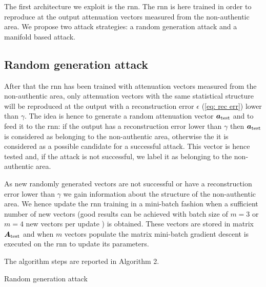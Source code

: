 \documentclass[draftcls,onecolumn,12pt]{IEEEtran}
\begin{document}
The first architecture we exploit is the \ac{rnn}. The \ac{rnn} is here trained in order to reproduce at the output attenuation vectors measured from the non-authentic area. We propose two attack strategies: a random generation attack and a manifold based attack.

\subsection{Random generation attack}
After that the \ac{rnn} has been trained with attenuation vectors measured from the non-authentic area, only attenuation vectors with the same statistical structure will be reproduced at the output with a reconstruction error $\epsilon$ (\ref{eq: rec err}) lower than $\gamma$. The idea is hence to generate a random attenuation vector $\bm{a}_{\rm test}$ and to feed it to the \ac{rnn}: if the output has a reconstruction error lower than $\gamma$ then $\bm{a}_{\rm test}$ is considered as belonging to the non-authentic area, otherwise the it is considered as a possible candidate for a successful attack. This vector is hence tested and, if the attack is not successful, we label it as belonging to the non-authentic area.

As new randomly generated vectors are not successful or have a reconstruction error lower than $\gamma$ we gain information about the structure of the non-authentic area. We hence update the \ac{rnn} training in a mini-batch fashion when a sufficient number of new vectors (good results can be achieved with batch size of $m=3$ or $m=4$ new vectors per update \cite{bengio-12}) is obtained. These vectors are stored in matrix $\bm{A}_{\rm test}$ and when $m$ vectors populate the matrix mini-batch gradient descent is executed on the \ac{rnn} to update its parameters.

The algorithm steps are reported in Algorithm 2.

\begin{algorithm}[t]
  \scriptsize

 

    
 \caption{Random generation attack}
\end{algorithm}
\end{document}
